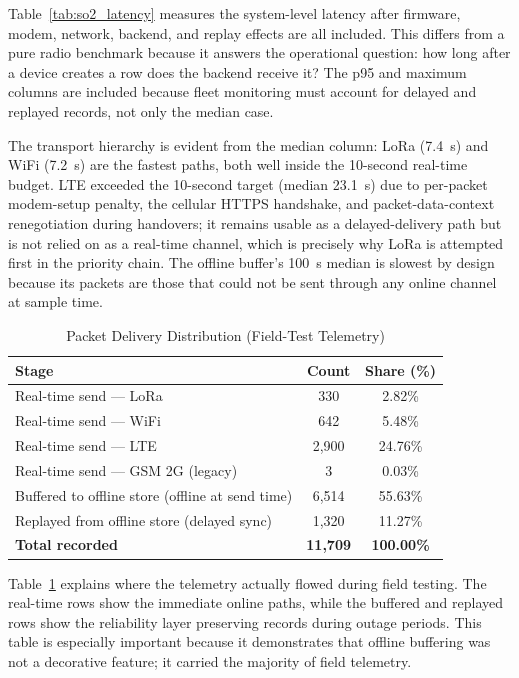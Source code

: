 Table~\ref{tab:so2_latency} measures the system-level latency after firmware, modem, network, backend, and replay effects are all included. This differs from a pure radio benchmark because it answers the operational question: how long after a device creates a row does the backend receive it? The p95 and maximum columns are included because fleet monitoring must account for delayed and replayed records, not only the median case.

The transport hierarchy is evident from the median column: LoRa (7.4~s) and WiFi (7.2~s) are the fastest paths, both well inside the 10-second real-time budget. LTE exceeded the 10-second target (median 23.1~s) due to per-packet modem-setup penalty, the cellular HTTPS handshake, and packet-data-context renegotiation during handovers; it remains usable as a delayed-delivery path but is not relied on as a real-time channel, which is precisely why LoRa is attempted first in the priority chain. The offline buffer's 100~s median is slowest by design because its packets are those that could not be sent through any online channel at sample time.

\begin{table}[!htbp]
\centering
\caption{Packet Delivery Distribution (Field-Test Telemetry)}
\label{tab:so2_packet_delivery}
\scriptsize
\begin{tabular}{|p{}|c|c|}
\hline
\textbf{Stage} & \textbf{Count} & \textbf{Share (\%)} \\
\hline
Real-time send --- LoRa & 330 & 2.82\% \\
\hline
Real-time send --- WiFi & 642 & 5.48\% \\
\hline
Real-time send --- LTE & 2{,}900 & 24.76\% \\
\hline
Real-time send --- GSM 2G (legacy) & 3 & 0.03\% \\
\hline
Buffered to offline store (offline at send time) & 6{,}514 & 55.63\% \\
\hline
Replayed from offline store (delayed sync) & 1{,}320 & 11.27\% \\
\hline
\textbf{Total recorded} & \textbf{11{,}709} & \textbf{100.00\%} \\
\hline
\end{tabular}
\normalsize
\end{table}

Table~\ref{tab:so2_packet_delivery} explains where the telemetry actually flowed during field testing. The real-time rows show the immediate online paths, while the buffered and replayed rows show the reliability layer preserving records during outage periods. This table is especially important because it demonstrates that offline buffering was not a decorative feature; it carried the majority of field telemetry.

